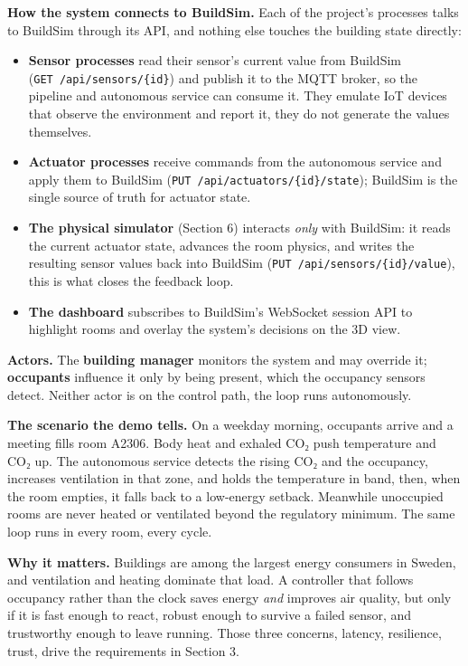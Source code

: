 \documentclass[
  11pt,
]{article}
\providecommand{\tightlist}{%
  \setlength{\itemsep}{0pt}\setlength{\parskip}{0pt}}
\begin{document}
\textbf{How the system connects to BuildSim.} Each of the project's processes
talks to BuildSim through its API, and nothing else touches the building
state directly:

\begin{itemize}
\tightlist
\item
  \textbf{Sensor processes} read their sensor's current value from
  BuildSim (\texttt{GET\ /api/sensors/\{id\}}) and publish it to the MQTT broker, so the pipeline and autonomous service can consume it. They
  emulate IoT devices that observe the environment and report it, they
  do not generate the values themselves.
\item
  \textbf{Actuator processes} receive commands from the autonomous
  service and apply them to BuildSim
  (\texttt{PUT\ /api/actuators/\{id\}/state}); BuildSim is the single
  source of truth for actuator state.
\item
  \textbf{The physical simulator} (Section 6) interacts \emph{only} with
  BuildSim: it reads the current actuator state, advances the room
  physics, and writes the resulting sensor values back into BuildSim
  (\texttt{PUT\ /api/sensors/\{id\}/value}), this is what closes the
  feedback loop.
\item
  \textbf{The dashboard} subscribes to BuildSim's WebSocket session API
  to highlight rooms and overlay the system's decisions on the 3D view.
\end{itemize}

\textbf{Actors.} The \textbf{building manager} monitors the system and
may override it; \textbf{occupants} influence it only by being present,
which the occupancy sensors detect. Neither actor is on the control path, the loop runs autonomously.

\textbf{The scenario the demo tells.} On a weekday morning, occupants
arrive and a meeting fills room A2306. Body heat and exhaled CO₂ push
temperature and CO₂ up. The autonomous service detects the rising CO₂
and the occupancy, increases ventilation in that zone, and holds the
temperature in band, then, when the room empties, it falls back to a
low-energy setback. Meanwhile unoccupied rooms are never heated or
ventilated beyond the regulatory minimum. The same loop runs in every
room, every cycle.

\textbf{Why it matters.} Buildings are among the largest energy
consumers in Sweden, and ventilation and heating dominate that load. A
controller that follows occupancy rather than the clock saves energy
\emph{and} improves air quality, but only if it is fast enough to react,
robust enough to survive a failed sensor, and trustworthy enough to
leave running. Those three concerns, latency, resilience, trust, drive the requirements in Section 3.
\end{document}
